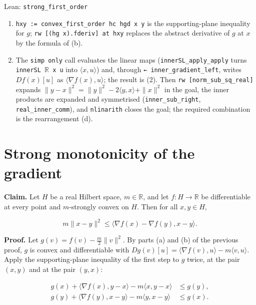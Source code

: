 \documentclass[11pt,a4paper]{article}
\begin{document}
\begin{leanbox}{Lean: \texttt{strong\_\allowbreak{}first\_\allowbreak{}order}}
\begin{enumerate}
\item \texttt{hxy := convex\_\allowbreak{}first\_\allowbreak{}order hc hgd x y} is the supporting-plane inequality for \(g\); \texttt{rw [(hg x).\allowbreak{}fderiv] at hxy} replaces the abstract derivative of \(g\) at \(x\) by the formula of (b).

\item The \texttt{simp only} call evaluates the linear maps (\texttt{inner\allowbreak{}SL\_\allowbreak{}apply\_\allowbreak{}apply} turns \texttt{inner\allowbreak{}SL \ensuremath{\mathbb R} x u} into \(\langle x,u\rangle\)) and, through \texttt{← inner\_\allowbreak{}gradient\_\allowbreak{}left}, writes \(Df(x)[u]\) as \(\langle\nabla f(x),u\rangle\); the result is (2). Then \texttt{rw [norm\_\allowbreak{}sub\_\allowbreak{}sq\_\allowbreak{}real]} expands \(\|y-x\|^2=\|y\|^2-2\langle y,x\rangle+\|x\|^2\) in the goal, the inner products are expanded and symmetrised (\texttt{inner\_\allowbreak{}sub\_\allowbreak{}right}, \texttt{real\_\allowbreak{}inner\_\allowbreak{}comm}), and \texttt{nlinarith} closes the goal; the required combination is the rearrangement (d).

\end{enumerate}
\end{leanbox}

\section{\texorpdfstring{Strong monotonicity of the gradient}{Strong monotonicity of the gradient}}


\textbf{Claim.} Let \(H\) be a real Hilbert space, \(m\in\mathbb R\), and let \(f:H\to\mathbb R\) be differentiable at every point and \(m\)-strongly convex on \(H\). Then for all \(x,y\in H\),


\[m\|x-y\|^2\le\langle\nabla f(x)-\nabla f(y),x-y\rangle.\]


\textbf{Proof.} Let \(g(v)=f(v)-\frac m2\|v\|^2\). By parts (a) and (b) of the previous proof, \(g\) is convex and differentiable with \(Dg(v)[u]=\langle\nabla f(v),u\rangle-m\langle v,u\rangle\). Apply the supporting-plane inequality of the first step to \(g\) twice, at the pair \((x,y)\) and at the pair \((y,x)\):


\[\begin{aligned}g(x)+\langle\nabla f(x),y-x\rangle-m\langle x,y-x\rangle&\le g(y),\\ g(y)+\langle\nabla f(y),x-y\rangle-m\langle y,x-y\rangle&\le g(x).\end{aligned}\]
\end{document}
